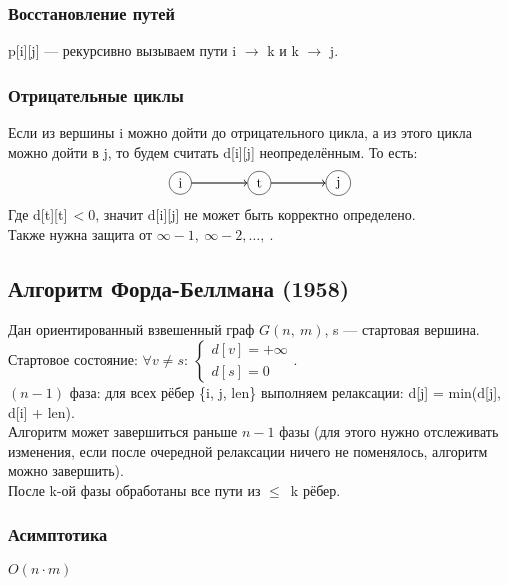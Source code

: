\documentclass[12pt, a4paper]{article}
\begin{document}
    \subsubsection*{Восстановление путей}
    p[i][j] --- рекурсивно вызываем пути i $\to$ k и k $\to$ j.
    \subsubsection*{Отрицательные циклы}
    Если из вершины i можно дойти до отрицательного цикла, а из этого цикла можно дойти в j, то будем считать d[i][j] неопределённым. То есть:
    \[\begin{tikzpicture}[every circle node/.style={draw}]
        \draw (-2, 0) node[circle](0){i};
        \draw (0, 0) node[circle](1){t};
        \draw (2, 0) node[circle](2){j};
        \draw[->, thick] (0) -- (1);
        \draw[->, thick] (1) -- (2);
    \end{tikzpicture}\]
    Где d[t][t]$\,< 0$, значит d[i][j] не может быть корректно определено.\\
    Также нужна защита от $\infty - 1,\ \infty - 2,\dots,\ $.
    \subsection{Алгоритм Форда-Беллмана (1958)}
    Дан ориентированный взвешенный граф $G(n,\ m)$, s --- стартовая вершина.\\
    Стартовое состояние: $\forall v \neq s:\ \begin{cases}
        d[v] = +\infty\\
        d[s] = 0
    \end{cases} $.\\
    $(n - 1)$ фаза: для всех рёбер \{i, j, len\} выполняем релаксации: d[j] = min(d[j], d[i] + len).\\
    Алгоритм может завершиться раньше $n - 1$ фазы (для этого нужно отслеживать изменения, если после очередной релаксации ничего не поменялось, алгоритм можно завершить).\\
    После k-ой фазы обработаны все пути из $\leq\,$ k рёбер.
    \subsubsection*{Асимптотика}
    $O(n\cdot m)$
\end{document}
